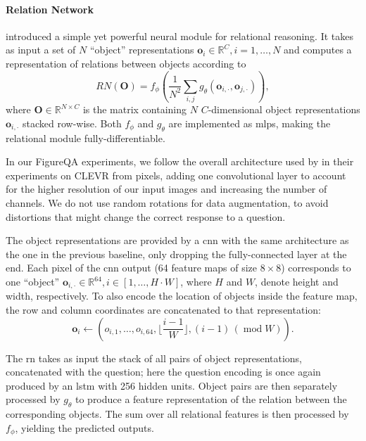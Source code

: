 \documentclass{article} %
\begin{document}
\paragraph{Relation Network} 
\citet{santoro2017simple} introduced a simple yet powerful neural module for relational reasoning. It takes as input a set of $N$ ``object'' representations $\mathbf{o}_i\in\mathbb{R}^C, i=1,\dots,N$ and computes a representation of relations between objects according to
\begin{equation}
    \label{eq:rn}
    RN(\mathbf{O}) = f_\phi\left(\frac{1}{N^2}\sum\limits_{i,j} g_\theta(\mathbf{o}_{i,\cdot}, \mathbf{o}_{j, \cdot})\right),
\end{equation}
where $\mathbf{O}\in\mathbb{R}^{N\times C}$ is the matrix containing $N$ $C$-dimensional object representations $\mathbf{o}_{i,\cdot}$ stacked row-wise.
Both $f_\phi$ and $g_\theta$ are implemented as \glspl{mlp}, making the relational module fully-differentiable.

In our FigureQA experiments, we follow the overall architecture used by \citet{santoro2017simple} in their experiments on CLEVR from pixels, adding one convolutional layer to account for the higher resolution of our input images and increasing the number of channels. We do not use random rotations for data augmentation, to avoid distortions that might change the correct response to a question.

The object representations are provided by a \gls{cnn} with the same architecture as the one in the previous baseline, only dropping the fully-connected layer at the end. 
Each pixel of the \gls{cnn} output (64 feature maps of size $8\times8$) corresponds to one ``object'' $\mathbf{o}_{i, \cdot}\in\mathbb{R}^{64}, i\in[1,\dots,H \cdot W]$,
where $H$ and $W$, denote height and width, respectively. 
To also encode the location of objects inside the feature map, the row and column coordinates are concatenated to that representation:
\begin{equation}
    \mathbf{o}_i \leftarrow (o_{i,1}, \dots, o_{i,64}, \lfloor\frac{i-1}{W}\rfloor, (i-1) \,(\operatorname{mod} W)).
\end{equation}

The \gls{rn} takes as input the stack of all pairs of object representations, concatenated with the question; here the question encoding is once again produced by an \gls{lstm} with 256 hidden units. 
Object pairs are then separately processed by $g_\theta$ to produce a feature representation of the relation between the corresponding objects. The sum over all relational features is then processed by $f_\phi$, yielding the predicted outputs.
\end{document}
